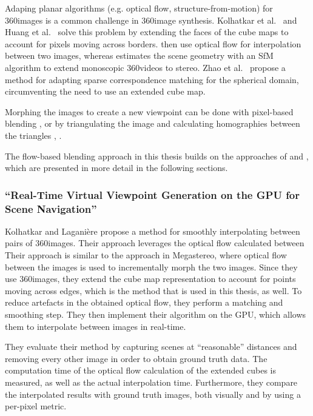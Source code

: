 Adaping planar algorithms (e.g. optical flow, structure-from-motion) for 360\degree images is a common challenge in 360\degree image synthesis. Kolhatkar et al.\ \cite{360flowblending} and Huang et al.\ \cite{6dof} solve this problem by extending the faces of the cube maps to account for pixels moving across borders. \cite{360flowblending} then use optical flow for interpolation between two images, whereas \cite{6dof} estimates the scene geometry with an SfM algorithm to extend monoscopic 360\degree videos to stereo. Zhao et al.\ \cite{cube2video} propose a method for adapting sparse correspondence matching for the spherical domain, circumventing the need to use an extended cube map.

Morphing the images to create a new viewpoint can be done with pixel-based blending \cite{megastereo}, \cite{360flowblending} or by triangulating the image and calculating homographies between the triangles \cite{6dof}, \cite{cube2video}.



The flow-based blending approach in this thesis builds on the approaches of \cite{megastereo} and \cite{360flowblending}, which are presented in more detail in the following sections.

\subsubsection{``Real-Time Virtual Viewpoint Generation on the GPU for Scene Navigation'' \cite{360flowblending}}
Kolhatkar and Lagani\`ere \cite{360flowblending} propose a method for smoothly interpolating between pairs of 360\degree images. Their approach leverages the optical flow calculated between 
Their approach is similar to the approach in Megastereo, where optical flow between the images is used to incrementally morph the two images. Since they use 360\degree images, they extend the cube map representation to account for points moving across edges, which is the method that is used in this thesis, as well. To reduce artefacts in the obtained optical flow, they perform a matching and smoothing step. They then implement their algorithm on the GPU, which allows them to interpolate between images in real-time. 

They evaluate their method by capturing scenes at ``reasonable'' distances and removing every other image in order to obtain ground truth data. The computation time of the optical flow calculation of the extended cubes is measured, as well as the actual interpolation time. Furthermore, they compare the interpolated results with ground truth images, both visually and by using a per-pixel metric.

